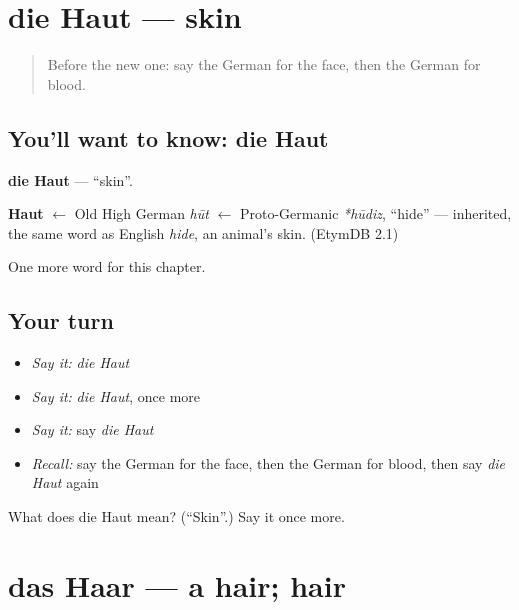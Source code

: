 \section[die Haut]{die Haut — skin}

\label{lesson:GE-C57-haut}



\begin{quote}
Before the new one: say the German for the face, then the German for blood.
\end{quote}

\subsection*{You'll want to know: die Haut}
\textbf{die Haut} — \textquotedblleft{}skin\textquotedblright{}.

\begin{cousinweb}
\textbf{Haut} $\leftarrow$ Old High German \emph{hūt} $\leftarrow$ Proto-Germanic \emph{*hūdiz}, \textquotedblleft{}hide\textquotedblright{} — inherited, the same word as English \emph{hide}, an animal's skin. (EtymDB 2.1)
\end{cousinweb}

\begin{grammarlens}[title={What you've built}]
One more word for this chapter.
\end{grammarlens}

\subsection*{Your turn}
\begin{itemize}
\raggedright
  \item \emph{Say it:} \emph{die Haut}
  \item \emph{Say it:} \emph{die Haut}, once more
  \item \emph{Say it:} say \emph{die Haut}
  \item \emph{Recall:} say the German for the face, then the German for blood, then say \emph{die Haut} again
\end{itemize}

\begin{tcolorbox}[breakable,colback=teal!4,colframe=teal!35!black,title={Before you move on}]
What does die Haut mean? (\textquotedblleft{}Skin\textquotedblright{}.) Say it once more.
\end{tcolorbox}
\section[das Haar]{das Haar — a hair; hair}

